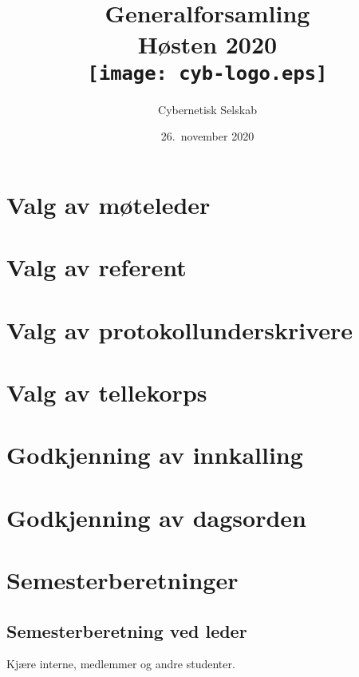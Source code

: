 \documentclass[10pt,norsk,a4paper]{article}
\title{Generalforsamling \\
	Høsten 2020\\[3cm]
	\texttt{[image: cyb-logo.eps]}\\[-.5cm]}
\date{26.\ november 2020}
\author{Cybernetisk Selskab}
\begin{document}
\maketitle{}
\newpage
\tableofcontents

\section{Valg av møteleder}

\section{Valg av referent}

\section{Valg av protokollunderskrivere}

\section{Valg av tellekorps}

\section{Godkjenning av innkalling}

\section{Godkjenning av dagsorden}

\section{Semesterberetninger}
\subsection{Semesterberetning ved leder}

Kjære interne, medlemmer og andre studenter.
\end{document}
